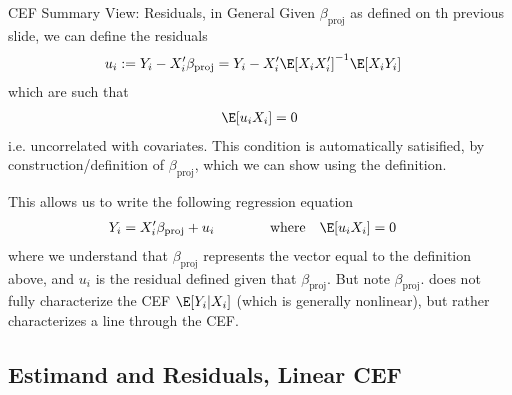\documentclass[aspectratio=169, handout]{beamer}
\begin{document}
{\scriptsize
\begin{frame}{CEF Summary View: Residuals, in General}
Given $\beta_{\text{proj}}$ as defined on th previous slide, we can
define the \alert{residuals}
\begin{align*}
  u_i
  &:=
  Y_i-X_i'
  \beta_\text{proj}
  =
  Y_i-X_i'
  \E[X_iX_i']^{-1}\E[X_iY_i]
\end{align*}
which are such that
\begin{align*}
  \E[u_iX_i]=0
\end{align*}
i.e. \alert{uncorrelated} with covariates.
This condition is \alert{automatically satisified}, by
construction/definition of $\beta_{\text{proj}}$, which we can show
using the definition.

This allows us to write the following \alert{regression equation}
\begin{align*}
  Y_i
  &=
  X_i'
  \beta_\text{proj}
  +
  u_i
  \qquad
  \qquad\text{where}\quad
  \E[u_iX_i]=0
\end{align*}
where we understand that
$\beta_\text{proj}$
represents the vector equal to the definition above, and $u_i$ is the
residual defined given that
$\beta_\text{proj}$.
But note
$\beta_\text{proj}$.
does \alert{not} fully characterize the CEF
$\E[Y_i|X_i]$ (which is generally nonlinear), but rather
characterizes a line through the CEF.
\end{frame}
}

\subsection{Estimand and Residuals, Linear CEF}
\end{document}
